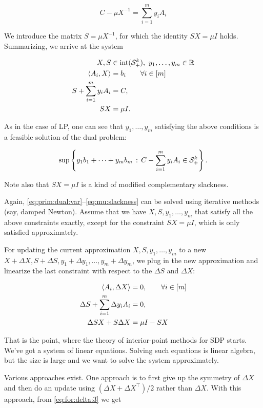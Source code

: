 \[
	C - \mu X^{-1} = \sum_{i=1}^m y_i A_i
\]

We introduce the matrix $S = \mu X^{-1}$, for which the identity $S X = \mu I$ holds. Summarizing, we arrive at the system

\begin{align}
	X, S & \in \operatorname{int}(\mathcal{S}_+^k),  \ y_1,\ldots,y_m \in \mathbb{R} \label{eq:prim:dual:var} \\
	\left\langle A_i , X \right\rangle & = b_i \label{eq:lin:eq} \qquad \forall i \in [m]\\
		S + \sum_{i=1}^m y_i A_i & = C,  \label{eq:prim:dual:lin:eq}\\ 
	S X & = \mu I. \label{eq:mu:slackness}
\end{align}

As in the case of LP, one can see that $y_1,\ldots,y_m$ satisfying the above conditions is a feasible solution of the dual problem: 

\[
	\sup \left\{ y_1 b_1 + \cdots + y_m b_m \,:\,  C - \sum_{i=1}^m y_i A_i \in \mathcal{S}_+^k \right\}.
\]

Note also that $S X  = \mu I$ is a kind of modified complementary slackness. 

Again, \eqref{eq:prim:dual:var}--\eqref{eq:mu:slackness} can be solved using iterative methods (say, damped Newton). Assume that we have $X,S,y_1,\ldots,y_m$ that satisfy all the above constraints exactly, except for the constraint $S X = \mu I$, which is only satisfied approximately.

For updating the current approximation $X,S,y_1,\ldots,y_m$ to a new $X+\Delta{X}, S + \Delta{S}, y_1 + \Delta{y_1},\ldots,y_m + \Delta{y_m}$, we plug in the new approximation and linearize the last constraint with respect to the $\Delta{S}$ and $\Delta{X}$:

\begin{align}
	\left\langle A_i , \Delta X \right\rangle & = 0, \qquad \forall i \in [m] \label{eq:for:delta:1}
	\\ \Delta{S} + \sum_{i=1}^m \Delta{y_i} A_i & = 0,\label{eq:for:delta:2}
	\\ \Delta{S} X + S \Delta{X} & = \mu I - S X \label{eq:for:delta:3}
\end{align}

That is the point, where the theory of interior-point methods for SDP starts. We've got a system of linear equations. Solving such equations is linear algebra, but the size is large and we want to solve the system approximately. 

Various approaches exist. One approach is to first give up the symmetry of $\Delta{X}$ and then do an update using  $(\Delta{X} + \Delta{X}^\top) /2$ rather than $\Delta{X}$. With this approach, from \eqref{eq:for:delta:3} we get 

